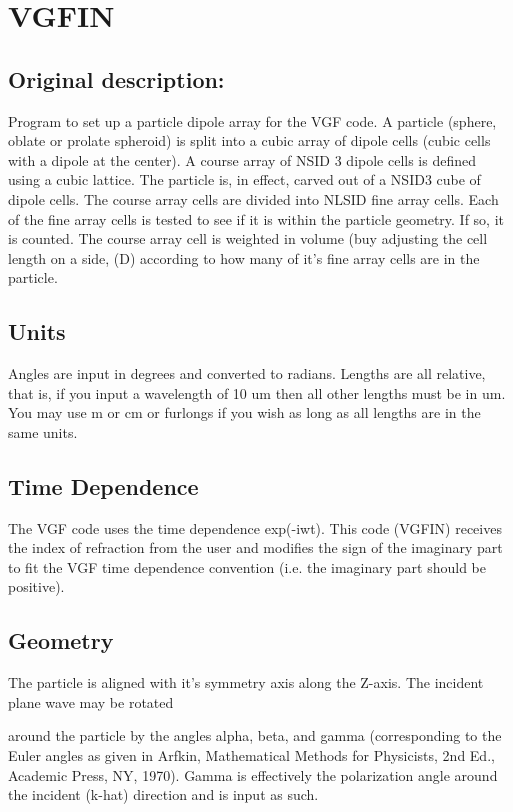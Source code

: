 \documentclass{article}
\begin{document}
\section{ VGFIN}

\subsection{Original description:}

Program to set up a particle dipole array for the VGF code. A particle
(sphere, oblate or prolate spheroid) is split into a cubic array of dipole
cells (cubic cells with a dipole at the center). A course array of NSID%
3 dipole cells is defined using a cubic lattice. The particle is,
in effect, carved out of a NSID3 cube of dipole cells. The course
array cells are divided into NLSID fine array cells. Each of the fine array
cells is tested to see if it is within the particle geometry. If so, it is
counted. The course array cell is weighted in volume (buy adjusting the cell
length on a side, (D) according to how many of it's fine array cells are in
the particle.

\subsection{Units}

Angles are input in degrees and converted to radians. Lengths are all
relative, that is, if you input a wavelength of 10 um then all other lengths
must be in um. You may use m or cm or furlongs if you wish as long as all
lengths are in the same units.

\subsection{Time Dependence}

The VGF code uses the time dependence exp(-iwt). This code (VGFIN) receives
the index of refraction from the user and modifies the sign of the imaginary
part to fit the VGF time dependence convention (i.e. the imaginary part
should be positive).

\subsection{Geometry}

The particle is aligned with it's symmetry axis along the Z-axis. The
incident plane wave may be rotated

around the particle by the angles alpha, beta, and gamma (corresponding to
the Euler angles as given in Arfkin, Mathematical Methods for Physicists,
2nd Ed., Academic Press, NY, 1970). Gamma is effectively the polarization
angle around the incident (k-hat) direction and is input as such.
\end{document}
